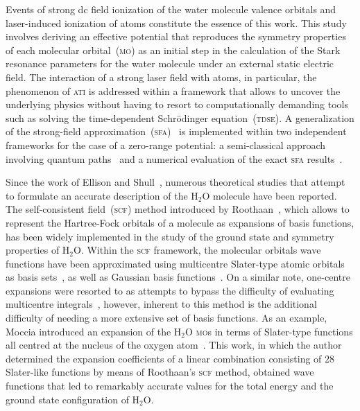 Events of strong dc field ionization of the water molecule valence
orbitals and laser-induced ionization of atoms constitute the essence
of this work. This study involves deriving an effective potential that
reproduces the symmetry properties of each molecular
orbital~(\textsc{mo}) as an initial step in the calculation of the
Stark resonance parameters for the water molecule under an external
static electric field.
The interaction of a strong laser field with atoms, in particular, the
phenomenon of \textsc{ati} is addressed within a framework that allows
to uncover the underlying physics without having to resort to
computationally demanding tools such as solving the time-dependent
Schr\"{o}dinger equation~(\textsc{tdse}). A generalization of the
strong-field approximation~(\textsc{sfa})~\cite{KeldyshSFA} is
implemented within two independent frameworks for the case of a
zero-range potential: a semi-classical approach involving quantum
paths~\cite{KopoldOptComm2000} and a numerical evaluation of the exact
\textsc{sfa} results~\cite{Kopold_1997sfa}.



Since the work of Ellison and Shull~\cite{EllisonShullh2o_1955},
numerous theoretical studies that attempt to formulate an accurate
description of the H$_{2}$O molecule have been reported. The
self-consistent field~(\textsc{scf}) method introduced by
Roothaan~\cite{Roothaan_1951}, which allows to represent the
Hartree-Fock orbitals of a molecule as expansions of basis functions,
has been widely implemented in the study of the ground state and
symmetry properties of H$_{2}$O. Within the \textsc{scf} framework,
the molecular orbitals wave functions have been approximated using
multicentre Slater-type atomic orbitals as basis
sets~\cite{Reeves_nature_1956,natureH2O_1960,Pitzer_1968,Pitzer_1970},
as well as Gaussian basis
functions~\cite{gaussianH2O_1965,Neumann_gaussian_1968}. On a similar
note, one-centre expansions were resorted to as attempts to bypass the
difficulty of evaluating multicentre
integrals~\cite{Moccia_1964,oneCentre_1961,Parr_JCP_1960}, however,
inherent to this method is the additional difficulty of needing a more
extensive set of basis functions. As an example, Moccia introduced an
expansion of the H$_{2}$O \textsc{mo}s in terms of Slater-type
functions all centred at the nucleus of the oxygen
atom~\cite{Moccia_1964}. This work, in which the author determined the
expansion coefficients of a linear combination consisting of $28$
Slater-like functions by means of Roothaan's \textsc{scf} method,
obtained wave functions that led to remarkably accurate values for the
total energy and the ground state configuration of H$_{2}$O.

